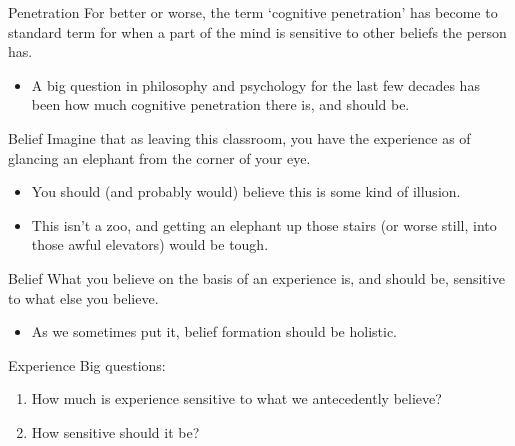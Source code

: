 \documentclass[
  17pt,
  letterpaper,
  ignorenonframetext,
  aspectratio=169,
  handout,
  xcolor={dvipsnames}]{beamer}
\providecommand{\tightlist}{%
  \setlength{\itemsep}{0pt}\setlength{\parskip}{0pt}}\usepackage{longtable,booktabs,array}
\begin{document}
\begin{frame}{Penetration}
\protect\hypertarget{penetration}{}
For better or worse, the term `cognitive penetration' has become to
standard term for when a part of the mind is sensitive to other beliefs
the person has.

\begin{itemize}[<+->]
\tightlist
\item
  A big question in philosophy and psychology for the last few decades
  has been how much cognitive penetration there is, and should be.
\end{itemize}
\end{frame}

\begin{frame}{Belief}
\protect\hypertarget{belief}{}
Imagine that as leaving this classroom, you have the experience as of
glancing an elephant from the corner of your eye.

\begin{itemize}[<+->]
\tightlist
\item
  You should (and probably would) believe this is some kind of illusion.
\item
  This isn't a zoo, and getting an elephant up those stairs (or worse
  still, into those awful elevators) would be tough.
\end{itemize}
\end{frame}

\begin{frame}{Belief}
\protect\hypertarget{belief-1}{}
What you believe on the basis of an experience is, and should be,
sensitive to what else you believe.

\begin{itemize}[<+->]
\tightlist
\item
  As we sometimes put it, belief formation should be holistic.
\end{itemize}
\end{frame}

\begin{frame}{Experience}
\protect\hypertarget{experience}{}
Big questions:

\begin{enumerate}[<+->]
\tightlist
\item
  How much is experience sensitive to what we antecedently believe?
\item
  How sensitive should it be?
\end{enumerate}
\end{frame}
\end{document}
